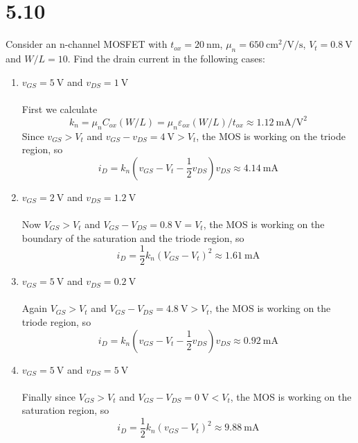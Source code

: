 \documentclass[12pt, a4paper]{article}
\title{} %
\author{} %
\date{} %
\begin{document}
\section{5.10}
Consider an n-channel MOSFET with $t_{ox} = \SI{20}\nm$, $\mu_{n} = \SI{650}{\cm\squared\per\V\per\s}$, $V_t = \SI{0.8}\V$ and $W/L = 10$. Find the drain current in the following cases:

\begin{enumerate}[label=(\alph*)]
  \item $v_{GS} = \SI{5}{\V}$ and $v_{DS} = \SI{1}{\V} $\\[5pt]
    \Ans \\
    First we calculate 
    \[ k_n = \mu_n C_{ox} (W / L) = \mu_n \varepsilon_{ox} (W / L) /  t_{ox} \approx \SI{1.12}{\mA\per\V\squared} \]
    Since $v_{GS} > V_t$ and $v_{GS} - v_{DS} = \SI{4}{\V} > V_t$, the MOS is working on the triode region, so 
    \[
      i_D =  k_n \left(v_{GS} - V_t - \frac{1}{2}v_{DS} \right)v_{DS} \approx \SI{4.14}{\mA} 
    \]
  \item $v_{GS} = \SI{2}{\V}$ and $v_{DS} = \SI{1.2}{\V} $\\[5pt]
    \Ans \\
    Now $V_{GS} > V_t$ and $V_{GS} - V_{DS} = \SI{0.8}{\V} = V_t$, the MOS is working on the boundary of the saturation and the triode region, so 
    \[
      i_D = \frac{1}{2} k_n (V_{GS} - V_t)^2 \approx \SI{1.61}{\mA} 
    \]
  \item $v_{GS} = \SI{5}{\V}$ and $v_{DS} = \SI{0.2}{\V} $\\[5pt]
    \Ans \\
    Again $V_{GS} > V_t$ and $V_{GS} - V_{DS} = \SI{4.8}{\V} > V_t$, the MOS is working on the triode region, so 
    \[
      i_D =  k_n \left(v_{GS} - V_t - \frac{1}{2}v_{DS} \right)v_{DS} \approx \SI{0.92}{\mA} 
    \]
  \item $v_{GS} = \SI{5}{\V}$ and $v_{DS} = \SI{5}{\V} $\\[5pt]
    \Ans \\
    Finally since $V_{GS} > V_t$ and $V_{GS} - V_{DS} = \SI{0}{\V} < V_t$, the MOS is working on the saturation region, so 
    \[
      i_D =  \frac{1}{2} k_n (v_{GS} - V_t)^2 \approx \SI{9.88}{\mA} 
    \]
\end{enumerate}
\end{document}
